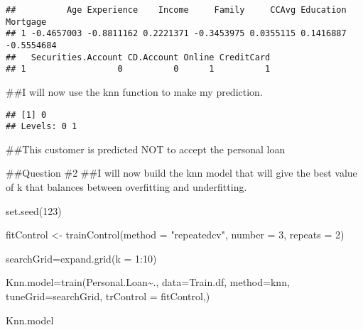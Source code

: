 \documentclass[
]{article}
\newenvironment{Shaded}{\begin{snugshade}}{\end{snugshade}}
\newcommand{\AttributeTok}[1]{\textcolor[rgb]{0.77,0.63,0.00}{#1}}
\newcommand{\DecValTok}[1]{\textcolor[rgb]{0.00,0.00,0.81}{#1}}
\newcommand{\FunctionTok}[1]{\textcolor[rgb]{0.00,0.00,0.00}{#1}}
\newcommand{\NormalTok}[1]{#1}
\newcommand{\OtherTok}[1]{\textcolor[rgb]{0.56,0.35,0.01}{#1}}
\newcommand{\SpecialCharTok}[1]{\textcolor[rgb]{0.00,0.00,0.00}{#1}}
\newcommand{\StringTok}[1]{\textcolor[rgb]{0.31,0.60,0.02}{#1}}
\begin{document}
\begin{verbatim}
##          Age Experience    Income     Family     CCAvg Education   Mortgage
## 1 -0.4657003 -0.8811162 0.2221371 -0.3453975 0.0355115 0.1416887 -0.5554684
##   Securities.Account CD.Account Online CreditCard
## 1                  0          0      1          1
\end{verbatim}

\#\#I will now use the knn function to make my prediction.

\begin{Shaded}
\end{Shaded}

\begin{verbatim}
## [1] 0
## Levels: 0 1
\end{verbatim}

\#\#This customer is predicted NOT to accept the personal loan

\#\#Question \#2 \#\#I will now build the knn model that will give the
best value of k that balances between overfitting and underfitting.

\begin{Shaded}
\begin{Highlighting}[]
\FunctionTok{set.seed}\NormalTok{(}\DecValTok{123}\NormalTok{)}

\NormalTok{fitControl }\OtherTok{\textless{}{-}} \FunctionTok{trainControl}\NormalTok{(}\AttributeTok{method =} \StringTok{"repeatedcv"}\NormalTok{,}
                           \AttributeTok{number =} \DecValTok{3}\NormalTok{,}
                           \AttributeTok{repeats =} \DecValTok{2}\NormalTok{)}

\NormalTok{searchGrid}\OtherTok{=}\FunctionTok{expand.grid}\NormalTok{(}\AttributeTok{k =} \DecValTok{1}\SpecialCharTok{:}\DecValTok{10}\NormalTok{)}

\NormalTok{Knn.model}\OtherTok{=}\FunctionTok{train}\NormalTok{(Personal.Loan}\SpecialCharTok{\textasciitilde{}}\NormalTok{., }
                \AttributeTok{data=}\NormalTok{Train.df,}
                \AttributeTok{method=}\StringTok{\textquotesingle{}knn\textquotesingle{}}\NormalTok{,}
                \AttributeTok{tuneGrid=}\NormalTok{searchGrid,}
                \AttributeTok{trControl =}\NormalTok{ fitControl,)}

\NormalTok{Knn.model}
\end{Highlighting}
\end{Shaded}
\end{document}
